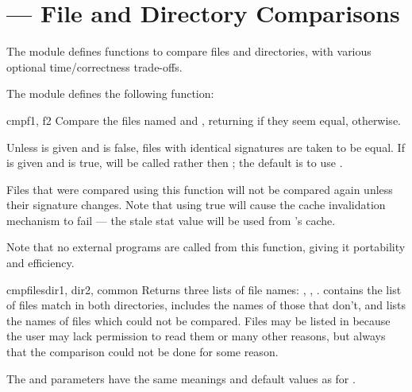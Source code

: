 \section{ ---
         File and Directory Comparisons}



The  module defines functions to compare files and directories,
with various optional time/correctness trade-offs.

The  module defines the following function:

\begin{funcdesc}{cmp}{f1, f2}
Compare the files named  and , returning  if
they seem equal,  otherwise.

Unless  is given and is false, files with identical
 signatures are taken to be equal.  If
 is given and is true,
 will be called rather then
; the default is to use .

Files that were compared using this function will not be compared again
unless their  signature changes. Note that using
 true will cause the cache invalidation mechanism to 
fail --- the stale stat value will be used from 's 
cache.

Note that no external programs are called from this function, giving it
portability and efficiency.
\end{funcdesc}

\begin{funcdesc}{cmpfiles}{dir1, dir2, common}
Returns three lists of file names: , ,
.   contains the list of files match in both
directories,  includes the names of those that don't,
and  lists the names of files which could not be
compared.  Files may be listed in  because the user may
lack permission to read them or many other reasons, but always that
the comparison could not be done for some reason.

The  and  parameters have the same
meanings and default values as for .
\end{funcdesc}

